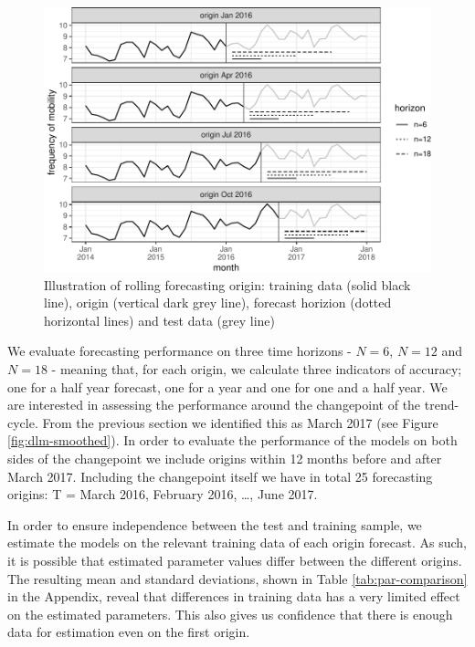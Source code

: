 \documentclass[]{article}
\begin{document}
\begin{figure}
\centering
\includegraphics{../figs/freq--rolling-forecast-example-1.pdf}
\caption{\label{fig:rolling-forecast-example}Illustration of rolling
forecasting origin: training data (solid black line), origin (vertical
dark grey line), forecast horizion (dotted horizontal lines) and test
data (grey line)}
\end{figure}

We evaluate forecasting performance on three time horizons - \(N=6\),
\(N=12\) and \(N=18\) - meaning that, for each origin, we calculate
three indicators of accuracy; one for a half year forecast, one for a
year and one for one and a half year. We are interested in assessing the
performance around the changepoint of the trend-cycle. From the previous
section we identified this as March 2017 (see Figure
\ref{fig:dlm-smoothed}). In order to evaluate the performance of the
models on both sides of the changepoint we include origins within 12
months before and after March 2017. Including the changepoint itself we
have in total 25 forecasting origins: T = March 2016, February 2016,
\ldots{}, June 2017.

In order to ensure independence between the test and training sample, we
estimate the models on the relevant training data of each origin
forecast. As such, it is possible that estimated parameter values differ
between the different origins. The resulting mean and standard
deviations, shown in Table \ref{tab:par-comparison} in the Appendix,
reveal that differences in training data has a very limited effect on
the estimated parameters. This also gives us confidence that there is
enough data for estimation even on the first origin.
\end{document}
